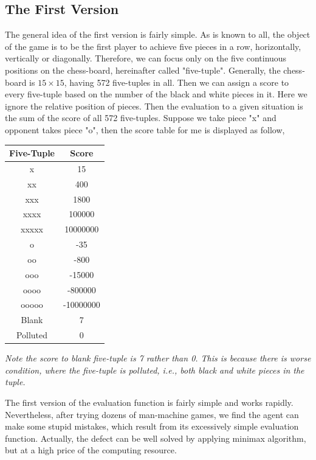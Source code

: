\documentclass[11pt,a4paper]{article}
\begin{document}
\subsection{The First Version}
The general idea of the first version is fairly simple. As is known to all, the object of the game is to be the first player to achieve five pieces in a row, horizontally, vertically or diagonally. Therefore, we can focus only on the five continuous positions on the chess-board, hereinafter called "five-tuple". Generally, the chess-board is $15\times 15$, having 572 five-tuples in all. Then we can assign a score to every five-tuple based on the number of the black and white pieces in it. Here we ignore the relative position of pieces. Then the evaluation to a given situation is the sum of the score of all 572 five-tuples. Suppose we take piece "x" and opponent takes piece "o", then the score table for me is displayed as follow,
\begin{table}[h]
\centering
\begin{tabular}{c|c}
\hline
Five-Tuple&Score \\
\hline
x&15\\
xx&400\\
xxx&1800\\
xxxx&100000\\
xxxxx&10000000\\
o&-35\\
oo&-800\\
ooo&-15000\\
oooo&-800000\\
ooooo&-10000000\\
Blank&7\\
Polluted&0\\
\hline
\end{tabular}
\end{table}

\noindent\begin{small}\emph{Note the score to blank five-tuple is 7 rather than 0. This is because there is worse condition, where the five-tuple is polluted, i.e., both black and white pieces in the tuple.}\end{small}

The first version of the evaluation function is fairly simple and works rapidly. Nevertheless, after trying dozens of man-machine games, we find the agent can make some stupid mistakes, which result from its excessively simple evaluation function. Actually, the defect can be well solved by applying minimax algorithm, but at a high price of the computing resource.
\end{document}

